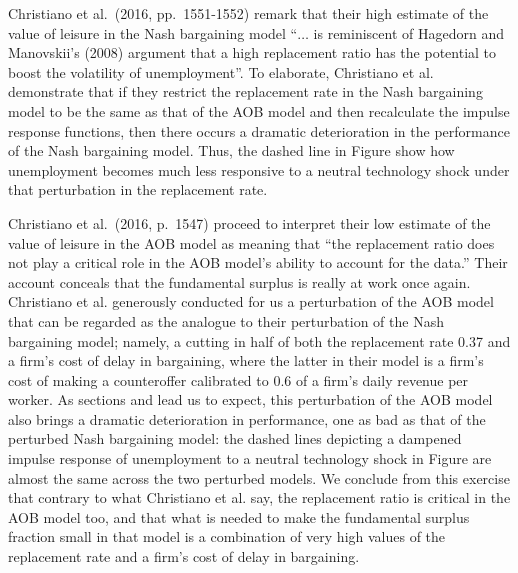  Christiano et al.\ (2016, pp.~1551-1552) remark that
   their high estimate of the value of leisure in the
Nash bargaining model ``$\ldots$  is reminiscent of Hagedorn
and Manovskii's (2008) argument that a high replacement ratio has
the potential to boost the volatility of unemployment''.
To elaborate, Christiano et al. demonstrate  that if they restrict the replacement
rate in the Nash bargaining model to be the same as that of the
AOB model and then recalculate the impulse response functions, then there occurs
a dramatic deterioration in the performance of the Nash
bargaining model. Thus,  the dashed line in Figure 
show how  unemployment becomes much less responsive to
a neutral technology shock under that perturbation in the replacement rate.

Christiano et al.\ (2016, p.~1547) proceed to interpret  their low estimate of the value of leisure in the
AOB model as meaning that ``the replacement ratio does not play a critical role
in the AOB model's ability to account for the data.''
Their account conceals that the fundamental surplus  is really at work once
again. Christiano et al.
 generously conducted for us
a perturbation of the AOB model that can be regarded as the
analogue to their perturbation of the Nash bargaining model;
namely, a cutting in half
of both the replacement rate 0.37 and a firm's cost of delay
in bargaining, where the latter in their model is a firm's
cost of  making a counteroffer  calibrated to 0.6 of a firm's
daily revenue per worker.
As  sections
 and  lead us to expect, this
perturbation of the AOB model also brings a dramatic
deterioration in performance, one as bad as that of the perturbed Nash
bargaining model: the dashed lines depicting a
dampened impulse response of unemployment to a neutral
technology shock in Figure  
are 
almost the same 
across the two perturbed models.
We conclude from this exercise that contrary to what Christiano et al. say,  the replacement ratio is  critical
in the AOB model too, and that  what is needed to make the fundamental surplus fraction small
in that model
is a combination of very high
values of the replacement rate and a firm's cost of delay in
bargaining.








